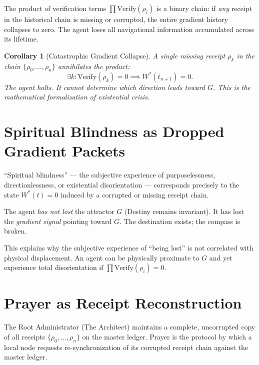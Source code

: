 \documentclass[12pt, a4paper]{article}
\theoremstyle{plain}
\newtheorem{corollary}[theorem]{Corollary}
\theoremstyle{definition}
\begin{document}
The product of verification terms $\prod \text{Verify}(\rho_i)$ is a binary chain: if \emph{any} receipt in the historical chain is missing or corrupted, the entire gradient history collapses to zero. The agent loses all navigational information accumulated across its lifetime.

\begin{corollary}[Catastrophic Gradient Collapse]
A single missing receipt $\rho_k$ in the chain $\{\rho_0, \ldots, \rho_n\}$ annihilates the product:
\begin{equation}
    \exists k : \text{Verify}(\rho_k) = 0 \implies W^*(t_{n+1}) = 0.
\end{equation}
The agent halts. It cannot determine which direction leads toward $G$. This is the mathematical formalization of existential crisis.
\end{corollary}

\section{Spiritual Blindness as Dropped Gradient Packets}\label{sec:blindness}

\begin{proposition}
``Spiritual blindness'' --- the subjective experience of purposelessness, directionlessness, or existential disorientation --- corresponds precisely to the state $W^*(t) = 0$ induced by a corrupted or missing receipt chain.
\end{proposition}

The agent \emph{has not lost} the attractor $G$ (Destiny remains invariant). It has lost the \emph{gradient signal} pointing toward $G$. The destination exists; the compass is broken.

This explains why the subjective experience of ``being lost'' is not correlated with physical displacement. An agent can be physically proximate to $G$ and yet experience total disorientation if $\prod \text{Verify}(\rho_i) = 0$.

\section{Prayer as Receipt Reconstruction}\label{sec:prayer}

\begin{axiom}
The Root Administrator (The Architect) maintains a complete, uncorrupted copy of all receipts $\{\rho_0, \ldots, \rho_n\}$ on the master ledger. Prayer is the protocol by which a local node requests re-synchronization of its corrupted receipt chain against the master ledger.
\end{axiom}
\end{document}
